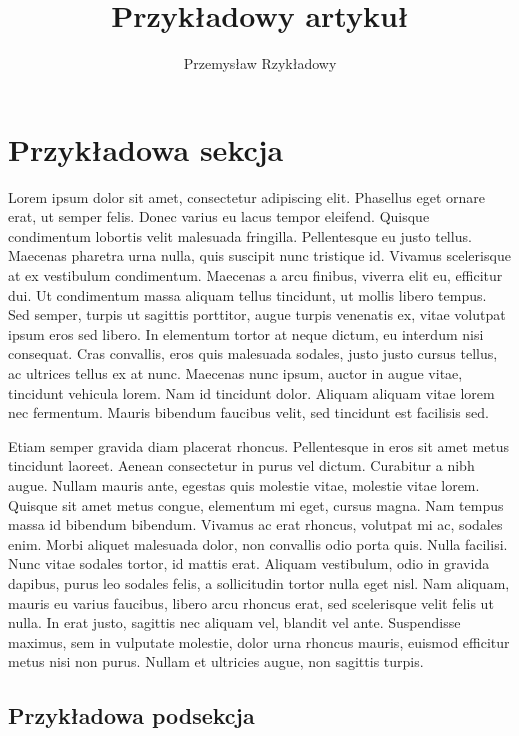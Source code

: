 \documentclass[10pt,a4paper,titlepage,twocolumn]{article}
\title{Przykładowy artykuł}
\author{Przemysław Rzykładowy}
\begin{document}
\maketitle
\newpage

\section{Przykładowa sekcja}

Lorem ipsum dolor sit amet, consectetur adipiscing elit. Phasellus eget ornare
erat, ut semper felis. Donec varius eu lacus tempor eleifend. Quisque
condimentum lobortis velit malesuada fringilla. Pellentesque eu justo tellus.
Maecenas pharetra urna nulla, quis suscipit nunc tristique id. Vivamus
scelerisque at ex vestibulum condimentum. Maecenas a arcu finibus, viverra elit
eu, efficitur dui. Ut condimentum massa aliquam tellus tincidunt, ut mollis
libero tempus. Sed semper, turpis ut sagittis porttitor, augue turpis venenatis
ex, vitae volutpat ipsum eros sed libero. In elementum tortor at neque dictum,
eu interdum nisi consequat. Cras convallis, eros quis malesuada sodales, justo
justo cursus tellus, ac ultrices tellus ex at nunc. Maecenas nunc ipsum, auctor
in augue vitae, tincidunt vehicula lorem. Nam id tincidunt dolor. Aliquam
aliquam vitae lorem nec fermentum. Mauris bibendum faucibus velit, sed tincidunt
est facilisis sed.

Etiam semper gravida diam placerat rhoncus. Pellentesque in eros sit amet metus
tincidunt laoreet. Aenean consectetur in purus vel dictum. Curabitur a nibh
augue. Nullam mauris ante, egestas quis molestie vitae, molestie vitae lorem.
Quisque sit amet metus congue, elementum mi eget, cursus magna. Nam tempus massa
id bibendum bibendum. Vivamus ac erat rhoncus, volutpat mi ac, sodales enim.
Morbi aliquet malesuada dolor, non convallis odio porta quis. Nulla facilisi.
Nunc vitae sodales tortor, id mattis erat. Aliquam vestibulum, odio in gravida
dapibus, purus leo sodales felis, a sollicitudin tortor nulla eget nisl. Nam
aliquam, mauris eu varius faucibus, libero arcu rhoncus erat, sed scelerisque
velit felis ut nulla. In erat justo, sagittis nec aliquam vel, blandit vel
ante. Suspendisse maximus, sem in vulputate molestie, dolor urna rhoncus
mauris, euismod efficitur metus nisi non purus. Nullam et ultricies augue, non
sagittis turpis.

\subsection{Przykładowa podsekcja}
\end{document}
